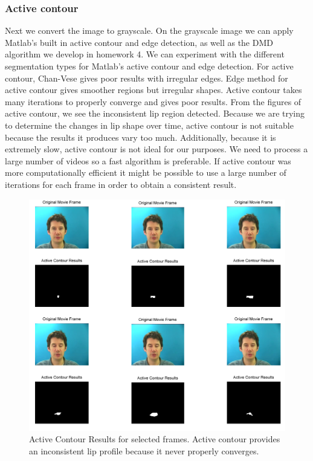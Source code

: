 \documentclass[a4paper]{article}
\begin{document}
\subsubsection{Active contour}
Next we convert the image to grayscale. On the grayscale image we can apply Matlab's built in active contour and edge detection, as well as the DMD algorithm we develop in homework 4. We can experiment with the different segmentation types for Matlab's active contour and edge detection. For active contour, Chan-Vese gives poor results with irregular edges. Edge method for active contour gives smoother regions but irregular shapes. Active contour takes many iterations to properly converge and gives poor results. From the figures of active contour, we see the inconsistent lip region detected. Because we are trying to determine the changes in lip shape over time, active contour is not suitable because the results it produces vary too much. Additionally, because it is extremely slow, active contour is not ideal for our purposes. We need to process a large number of videos so a fast algorithm is preferable. If active contour was more computationally efficient it might be possible to use a large number of iterations for each frame in order to obtain a consistent result.  \par
\begin{figure}[!ht]
	\includegraphics[width=1\textwidth, height=0.75\textwidth]{AC1.png}
	\caption{Active Contour Results for selected frames. Active contour provides an inconsistent lip profile because it never properly converges.}
\end{figure}
\end{document}
